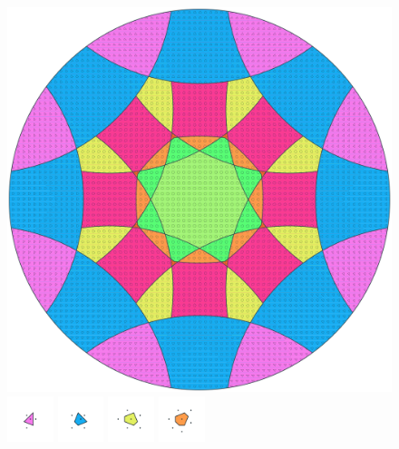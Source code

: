 \documentclass[text.tex]{subfiles}
\begin{document}
\clearpage
\pagestyle{fancy}
\fancyhf{}
\begin{figure}[h!]
\centering
\includegraphics[width=1\textwidth]{img/results/circle8/circle8_149964_(4759_-1970alpha_2).pdf}
\includegraphics[width=0.12\textwidth]{img/results/circle8/circle8_149964_(4759_-1970alpha_2)_001.pdf}
\includegraphics[width=0.12\textwidth]{img/results/circle8/circle8_149964_(4759_-1970alpha_2)_002.pdf}
\includegraphics[width=0.12\textwidth]{img/results/circle8/circle8_149964_(4759_-1970alpha_2)_003.pdf}
\includegraphics[width=0.12\textwidth]{img/results/circle8/circle8_149964_(4759_-1970alpha_2)_004.pdf}

\end{figure}
\end{document}

